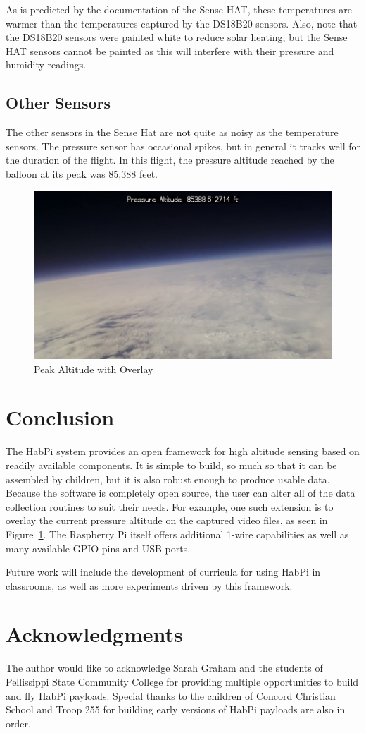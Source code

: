 \documentclass[journal]{new-aiaa}
\begin{document}
As is predicted by the documentation of the Sense HAT, these
temperatures are warmer than the temperatures captured by the DS18B20
sensors.  Also, note that the DS18B20 sensors were painted white to
reduce solar heating, but the Sense HAT sensors cannot be painted as this
will interfere with their pressure and humidity readings.

\subsection{Other Sensors}
The other sensors in the Sense Hat are not quite as noisy as the
temperature sensors.  The pressure sensor has occasional spikes, but
in general it tracks well for the duration of the flight.  In this
flight, the pressure altitude reached by the balloon at its peak was
85,388 feet.  

\begin{figure}
    \centering
    \includegraphics[width=0.65\linewidth]{images/peak-altitude}
    \caption{Peak Altitude with Overlay}
    \label{fig:peak}
\end{figure}

\section{Conclusion}
The HabPi system provides an open framework for high altitude sensing
based on readily available components.  It is simple to build, so much
so that it can be assembled by children, but it is also robust enough
to produce usable data.  Because the software is completely open
source, the user can alter all of the data collection routines to
suit their needs.  For example, one such extension is to overlay the
current pressure altitude on the captured video files, as seen in
Figure~\ref{fig:peak}.  The Raspberry Pi itself offers additional
1-wire capabilities as well as many available GPIO pins and USB ports.  

Future work will include the development of curricula for using HabPi
in classrooms, as well as more experiments driven by this framework.

\section{Acknowledgments}
The author would like to acknowledge Sarah Graham and the students of
Pellissippi State Community College for providing multiple
opportunities to build and fly HabPi payloads.  Special thanks to the
children of Concord Christian School and Troop 255 for building early
    versions of HabPi payloads are also in order.


\end{document}
